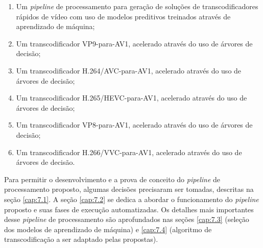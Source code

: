 \begin{enumerate}[1.]
    \item Um \textit{pipeline} de processamento para geração de soluções de transcodificadores rápidos de vídeo com uso de modelos preditivos treinados através de aprendizado de máquina;

    \item Um transcodificador VP9-para-AV1, acelerado através do uso de árvores de decisão;

    \item Um transcodificador H.264/AVC-para-AV1, acelerado através do uso de árvores de decisão;

    \item Um transcodificador H.265/HEVC-para-AV1, acelerado através do uso de árvores de decisão;

    \item Um transcodificador VP8-para-AV1, acelerado através do uso de árvores de decisão;

    \item Um transcodificador H.266/VVC-para-AV1, acelerado através do uso de árvores de decisão.
    
\end{enumerate}

Para permitir o desenvolvimento e a prova de conceito do \textit{pipeline} de processamento proposto, algumas decisões precisaram ser tomadas, descritas na seção \ref{cap:7.1}. A seção \ref{cap:7.2} se dedica a abordar o funcionamento do \textit{pipeline} proposto e suas fases de execução automatizadas. Os detalhes mais importantes desse \textit{pipeline} de processamento são aprofundados nas seções \ref{cap:7.3} (seleção dos modelos de aprendizado de máquina) e \ref{cap:7.4} (algoritmo de transcodificação a ser adaptado pelas propostas).





